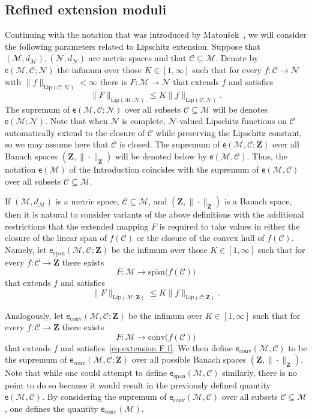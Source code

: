 \documentclass[11pt,reqno]{amsart}
\renewcommand{\le}{\leqslant}
\newcommand{\NN}{\mathcal{N}}
\theoremstyle{remark}
\newcommand{\MM}{\mathcal{M}}
\renewcommand{\subset}{\subseteq}
\newcommand{\Lip}{\mathrm{Lip}}
\newcommand{\ee}{\mathsf{e}}
\newcommand{\bfZ}{\mathbf{Z}}
\newcommand{\sub}{\mathscr{C}}
\renewcommand{\1}{\mathbf 1}
\newcommand{\conv}{\mathrm{conv}}
\newcommand{\spn}{\mathrm{ span}}
\begin{document}
\subsection{Refined extension moduli}\label{sec:ext refined} Continuing with the notation that was introduced by Matou\v{s}ek~\cite{Mat90}, we will consider the following   parameters related to Lipschitz extension. Suppose that $(\MM,d_\MM), (\NN,d_\NN)$ are metric spaces and that $\sub\subset \MM$. Denote by $\ee(\MM,\sub;\NN)$ the infimum over those $K\in [1,\infty]$ such that for every $f:\sub\to \NN$ with $\|f\|_{\Lip(\sub;\NN)}<\infty$ there is $F:\MM\to \NN$ that extends $f$ and satisfies $$\|F\|_{\Lip(\MM;\NN)}\le K\|f\|_{\Lip(\sub;\NN)}.$$
The supremum of $\ee(\MM,\sub;\NN)$ over all subsets $\sub\subset \MM$ will be denotes $\ee(\MM;\NN)$. Note that when $\NN$  is complete, $\NN$-valued Lipschitz functions on $\sub$ automatically extend to the closure of $\sub$ while preserving the Lipschitz constant, so we may assume here that $\sub$ is closed. The supremum of $\ee(\MM,\sub;\bfZ)$ over all Banach spaces $(\bfZ,\|\cdot\|_\bfZ)$ will be denoted below by $\ee(\MM,\sub)$. Thus, the notation $\ee(\MM)$ of the Introduction coincides with the supremum of $\ee(\MM,\sub)$ over all subsets $\sub\subset \MM$.

If $(\MM,d_\MM)$ is a metric space, $\sub\subset \MM$, and $(\bfZ,\|\cdot\|_\bfZ)$ is a Banach space, then it is natural  to consider variants of the above definitions with the additional restrictions that the extended mapping $F$ is required to take values in either the closure of the linear span of $f(\sub)$ or the closure of the convex hull of $f(\sub)$. Namely,  let $\ee_{\spn}(\MM,\sub;\bfZ)$  be the infimum over those $K\in [1,\infty]$ such that for every $f:\sub\to \bfZ$ there exists $$F:\MM\to \overline{\spn}\big(f(\sub)\big)$$ that extends $f$ and satisfies
\begin{equation}\label{eq:extension F f}
\|F\|_{\Lip(\MM;\bfZ)}\le K\|f\|_{\Lip(\sub;\bfZ)}.
\end{equation}

Analogously, let $\ee_{\conv}(\MM,\sub;\bfZ)$ be the infimum over  $K\in [1,\infty]$ such that for every $f:\sub\to \bfZ$ there exists $$F:\MM\to \overline{\conv}\big(f(\sub)\big)$$ that extends $f$ and satisfies~\eqref{eq:extension F f}. We then define $\ee_\conv(\MM,\sub)$ to be the supremum of $\ee_{\conv}(\MM,\sub;\bfZ)$ over all possible Banach spaces $(\bfZ,\|\cdot\|_\bfZ)$. Note that while one could attempt to define $\ee_\spn(\MM,\sub)$ similarly, there is no point to do so because it would result in the previously defined quantity   $\ee(\MM,\sub)$. By considering the supremum  of $\ee_\conv(\MM,\sub)$ over all subsets $\sub\subset \MM$, one defines the quantity $\ee_\conv(\MM)$.
\end{document}
